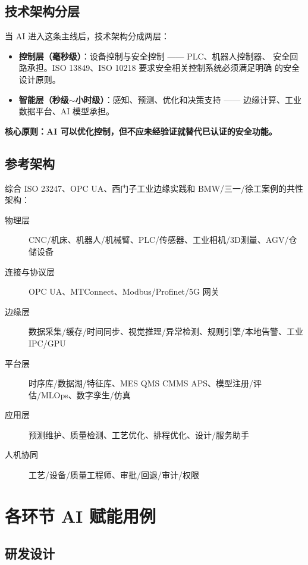 \documentclass[a4paper,12pt]{ctexart}
\begin{document}
\subsection{技术架构分层}

当 AI 进入这条主线后，技术架构分成两层：

\begin{itemize}
\item \textbf{控制层（毫秒级）}：设备控制与安全控制 —— PLC、机器人控制器、
      安全回路承担。ISO 13849、ISO 10218 要求安全相关控制系统必须满足明确
      的安全设计原则。
\item \textbf{智能层（秒级$\sim$小时级）}：感知、预测、优化和决策支持 ——
      边缘计算、工业数据平台、AI 模型承担。
\end{itemize}

\textbf{核心原则：AI 可以优化控制，但不应未经验证就替代已认证的安全功能。}

\subsection{参考架构}

综合 ISO 23247、OPC UA、西门子工业边缘实践和 BMW/三一/徐工案例的共性架构：

\begin{description}
\item[物理层] CNC/机床、机器人/机械臂、PLC/传感器、工业相机/3D测量、AGV/仓储设备
\item[连接与协议层] OPC UA、MTConnect、Modbus/Profinet/5G 网关
\item[边缘层] 数据采集/缓存/时间同步、视觉推理/异常检测、规则引擎/本地告警、工业 IPC/GPU
\item[平台层] 时序库/数据湖/特征库、MES QMS CMMS APS、模型注册/评估/MLOps、数字孪生/仿真
\item[应用层] 预测维护、质量检测、工艺优化、排程优化、设计/服务助手
\item[人机协同] 工艺/设备/质量工程师、审批/回退/审计/权限
\end{description}

\section{各环节 AI 赋能用例}

\subsection{研发设计}
\end{document}
